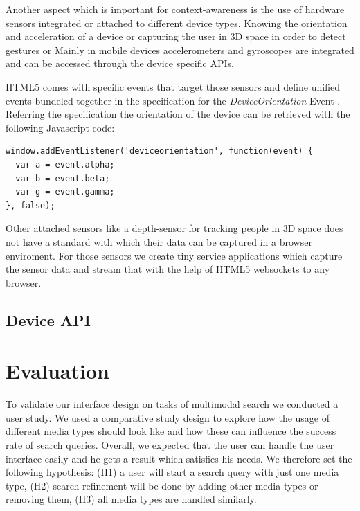 \documentclass[runningheads,a4paper]{llncs} \usepackage[utf8]{inputenc}
\begin{document}
Another aspect which is important for context-awareness is the use of
hardware sensors integrated or attached to different device types. 
Knowing the orientation and acceleration of a device or capturing the user
in 3D space in order to detect gestures or
Mainly in mobile devices accelerometers and gyroscopes are integrated and
can be accessed through the device specific APIs. 

HTML5 comes with specific events that target those sensors and define unified
events bundeled together in the specification for the \emph{DeviceOrientation}
Event \cite{deviceOrientation}. Referring the specification the orientation of
the device can be retrieved with the following Javascript code:
\begin{lstlisting}
window.addEventListener('deviceorientation', function(event) {
  var a = event.alpha;
  var b = event.beta;
  var g = event.gamma;
}, false);
\end{lstlisting}

Other attached sensors like a depth-sensor for tracking people in 3D space
does not have a standard with which their data can be captured in a browser
enviroment. For those sensors we create tiny service applications which capture
the sensor data and stream that with the help of HTML5 websockets
\cite{websockets} to any browser.

\subsection{Device API}



\section{Evaluation}

To validate our interface design on tasks of multimodal search we conducted a
user study. We used a comparative study design to explore how the usage of
different media types should look like and how these can influence the success
rate of search queries. Overall, we expected that the user can handle the user
interface easily and he gets a result which satisfies his needs. We therefore
set the following hypothesis: (H1) a user will start a search query with just one media type, (H2) search refinement will be done by adding other media types
or removing them, (H3) all media types are handled similarly.

\end{document}
